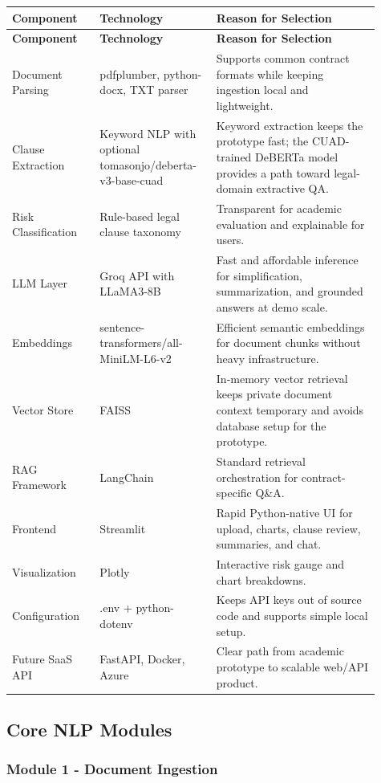 \documentclass[11pt,a4paper]{article}
\begin{document}
\begin{longtable}{L{0.22\linewidth} L{0.28\linewidth} L{0.41\linewidth}}
\toprule
\textbf{Component} & \textbf{Technology} & \textbf{Reason for Selection} \\
\midrule
\endfirsthead
\toprule
\textbf{Component} & \textbf{Technology} & \textbf{Reason for Selection} \\
\midrule
\endhead
Document Parsing & pdfplumber, python-docx, TXT parser & Supports common contract formats while keeping ingestion local and lightweight. \\
Clause Extraction & Keyword NLP with optional tomasonjo/deberta-v3-base-cuad & Keyword extraction keeps the prototype fast; the CUAD-trained DeBERTa model provides a path toward legal-domain extractive QA. \\
Risk Classification & Rule-based legal clause taxonomy & Transparent for academic evaluation and explainable for users. \\
LLM Layer & Groq API with LLaMA3-8B & Fast and affordable inference for simplification, summarization, and grounded answers at demo scale. \\
Embeddings & sentence-transformers/all-MiniLM-L6-v2 & Efficient semantic embeddings for document chunks without heavy infrastructure. \\
Vector Store & FAISS & In-memory vector retrieval keeps private document context temporary and avoids database setup for the prototype. \\
RAG Framework & LangChain & Standard retrieval orchestration for contract-specific Q\&A. \\
Frontend & Streamlit & Rapid Python-native UI for upload, charts, clause review, summaries, and chat. \\
Visualization & Plotly & Interactive risk gauge and chart breakdowns. \\
Configuration & .env + python-dotenv & Keeps API keys out of source code and supports simple local setup. \\
Future SaaS API & FastAPI, Docker, Azure & Clear path from academic prototype to scalable web/API product. \\
\bottomrule
\end{longtable}

\subsection{Core NLP Modules}

\subsubsection{Module 1 - Document Ingestion}
\end{document}
